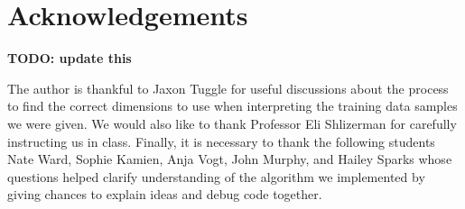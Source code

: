 \documentclass[11pt]{amsart}
\begin{document}
\section*{Acknowledgements} \textbf{TODO: update this}

The author is thankful to Jaxon Tuggle for useful discussions about the process to find the correct dimensions to use when interpreting the training data samples we were given.
We would also like to thank Professor Eli Shlizerman for carefully instructing us in class.
Finally, it is necessary to thank the following students Nate Ward, Sophie Kamien, Anja Vogt, John Murphy, and Hailey Sparks whose questions helped clarify understanding of the algorithm we implemented by giving chances to explain ideas and debug code together.


\end{document}
